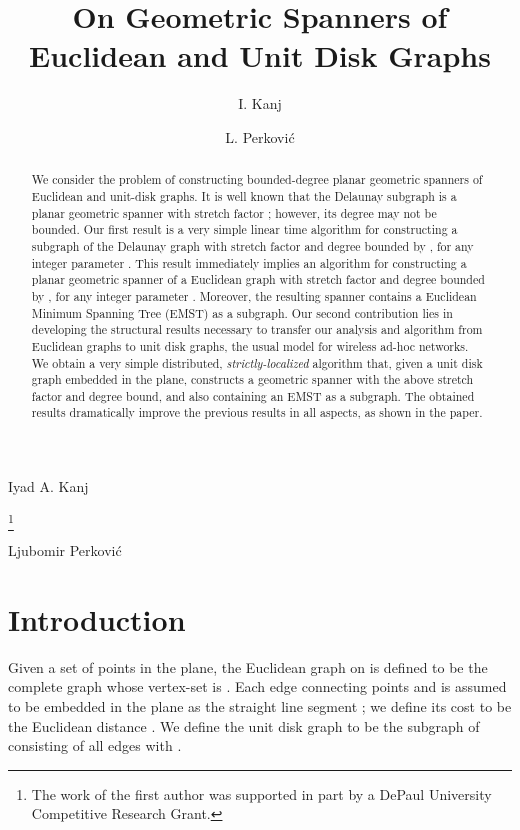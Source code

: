 \documentclass{stacs_proc}
\theoremstyle{plain}\newtheorem{satz}[thm]{Satz}
\begin{document}
\title{On Geometric Spanners of Euclidean and Unit Disk Graphs}
\author[]{I. Kanj}{Iyad A. Kanj}
\address[]{DePaul University, Chicago, IL 60604, USA.}
\thanks{The work of the first author was supported in part by a DePaul
University Competitive Research Grant.}

\author[]{L. Perkovi\'{c}}{Ljubomir Perkovi\'{c}}


\begin{abstract}
  \noindent We consider the problem of constructing bounded-degree planar
geometric spanners of Euclidean and unit-disk graphs. It is well known that
the Delaunay subgraph is a planar geometric spanner with stretch
factor ; however, its degree may not be
bounded. Our first result is a very simple linear time
algorithm for constructing a subgraph of the Delaunay graph with
stretch factor  and degree
bounded by , for any integer parameter . This result
immediately implies an algorithm for constructing a planar geometric
spanner of a Euclidean graph with stretch factor  and degree bounded by , for any integer parameter . Moreover, the resulting spanner contains a Euclidean Minimum Spanning Tree
(EMST) as a subgraph. Our second contribution lies in developing the structural
results necessary to transfer our analysis and algorithm from
Euclidean graphs to unit disk graphs, the usual model for wireless ad-hoc
networks. We obtain a very simple distributed, {\em strictly-localized}
algorithm that, given a unit disk graph embedded in the plane, constructs a 
geometric spanner with the above stretch factor and degree bound, and also
containing an EMST as a subgraph.  The obtained results
dramatically improve the previous results in all aspects, as shown
in the paper. 
\end{abstract}

\maketitle


\section*{Introduction} \label{intro}
Given a set of points  in the plane, the Euclidean graph  on
 is defined to be the complete graph whose vertex-set is .
Each edge  connecting points  and  is assumed to be
embedded in the plane as the straight line segment ; we define
its cost to be the Euclidean distance . We
define the unit disk graph  to be the subgraph of  consisting
of all edges  with .
\end{document}

